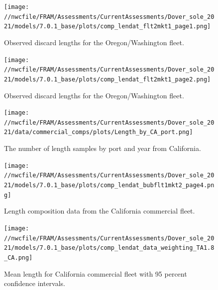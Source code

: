 \documentclass[11pt,
  english,
  a4paper,
]{article}
\begin{document}
\begin{figure}
\centering
\texttt{[image: //nwcfile/FRAM/Assessments/CurrentAssessments/Dover\_sole\_2021/models/7.0.1\_base/plots/comp\_lendat\_flt2mkt1\_page1.png]}
\caption{Observed discard lengths for the Oregon/Washington fleet.\label{fig:orwa-disc-len-ob-1}}
\end{figure}

\tagmcend\tagstructend


\begin{figure}
\centering
\texttt{[image: //nwcfile/FRAM/Assessments/CurrentAssessments/Dover\_sole\_2021/models/7.0.1\_base/plots/comp\_lendat\_flt2mkt1\_page2.png]}
\caption{Observed discard lengths for the Oregon/Washington fleet.\label{fig:orwa-disc-len-ob-2}}
\end{figure}

\tagmcend\tagstructend


\begin{figure}
\centering
\texttt{[image: //nwcfile/FRAM/Assessments/CurrentAssessments/Dover\_sole\_2021/data/commercial\_comps/plots/Length\_by\_CA\_port.png]}
\caption{The number of length samples by port and year from California.\label{fig:ca-len-port}}
\end{figure}

\tagmcend\tagstructend


\begin{figure}
\centering
\texttt{[image: //nwcfile/FRAM/Assessments/CurrentAssessments/Dover\_sole\_2021/models/7.0.1\_base/plots/comp\_lendat\_bubflt1mkt2\_page4.png]}
\caption{Length composition data from the California commercial fleet.\label{fig:ca-len-data}}
\end{figure}

\tagmcend\tagstructend


\begin{figure}
\centering
\texttt{[image: //nwcfile/FRAM/Assessments/CurrentAssessments/Dover\_sole\_2021/models/7.0.1\_base/plots/comp\_lendat\_data\_weighting\_TA1.8\_CA.png]}
\caption{Mean length for California commercial fleet with 95 percent confidence intervals.\label{fig:mean-ca-len-data}}
\end{figure}
\end{document}
